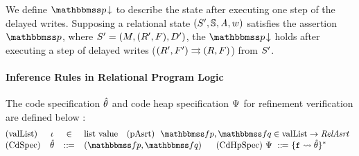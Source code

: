 {\color{blue}
We define $\nxtAst{\relastP}$ to describe the 
state after executing one step of the delayed writes.  
Supposing a relational state 
$(S', \mathbb{S}, \textit{A}, w)$ satisfies the 
assertion $\relastP$, where $S' = (M, (R', F), D')$, 
the $\nxtAst{\relastP}$ holds after executing a step 
of delayed writes (${(R', F')}\rightrightarrows{(R, F)}$) 
from $S'$.
}

\paragraph{Inference Rules in Relational Program Logic}
The code specification $\hat{\theta}$ and code heap specification 
$\Psi$ for refinement verification are defined below : 
\[
    \small
    \!\!\!\!
    \begin{array}{lccl}
        \TYPE{(valList)} & 
        \lgvl & \in & \TYPE{list} \ \TYPE{value}
        \quad
        \TYPE{(pAsrt)} \ \
        \relspecpre, \relspecpost \in
        \TYPE{valList} \rightarrow \textit{RelAsrt} \\
        \TYPE{(CdSpec)} & \RelBspec & \define & 
        (\relspecpre, \relspecpost) \quad \ \   
        \TYPE{(CdHpSpec)} \ \Cspec \ \define \ 
        \{ \lab{} \rightsquigarrow \RelBspec \}^{*} 
    \end{array}
\]
			
